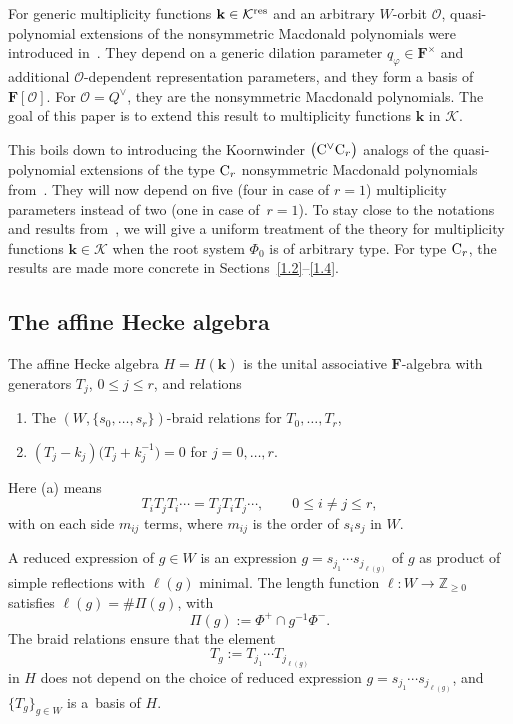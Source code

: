 \documentclass[pdftex]{sigma}
\numberwithin{equation}{section}
\begin{document}
For generic multiplicity functions $\mathbf{k}\in\mathcal{K}^{{\rm res}}$ and an arbitrary $W$-orbit $\mathcal{O}$, quasi-polynomial extensions of the nonsymmetric Macdonald polynomials were introduced in~\cite{SSV2}. They depend on a generic dilation parameter $q_\varphi\in\mathbf{F}^\times$ and additional $\mathcal{O}$-dependent representation parameters, and they form a basis of $\mathbf{F}[\mathcal{O}]$. For $\mathcal{O}=Q^\vee$, they are the nonsymmetric Macdonald polynomials.
The goal of this paper is to extend this result to multiplicity functions $\mathbf{k}$ in $\mathcal{K}$.

This boils down to introducing the Koornwinder $\bigl({\rm C}^\vee{\rm C}_r\bigr)$ analogs of the quasi-polynomial extensions of the type ${\rm C}_r$ nonsymmetric Macdonald polynomials from~\cite{SSV2}. They will now depend on five (four in case of $r=1$) multiplicity parameters instead of two (one in case of~${r=1}$). To stay close to the notations and results from~\cite{SSV2}, we will give a uniform treatment
of the theory for multiplicity functions $\mathbf{k}\in\mathcal{K}$ when the root system $\Phi_0$ is of arbitrary type. For type ${\rm C}_r$, the results are made more concrete in Sections~\ref{1.2}--\ref{1.4}.

\subsection{The affine Hecke algebra}\label{AHAsection}

The affine Hecke algebra $H=H(\mathbf{k})$ is the unital associative $\mathbf{F}$-algebra with generators $T_j$, $0\leq j\leq r$, and relations
\begin{enumerate}\itemsep=0pt\samepage
\item[(a)] The $(W,\{s_0,\dots,s_r\})$-braid relations for $T_0,\dots,T_r$,
\item[(b)] $(T_j-k_j)\bigl(T_j+k_j^{-1}\bigr)=0$ for $j=0,\dots,r$.
\end{enumerate}\pagebreak

\noindent
Here (a) means{\samepage
\[
T_iT_jT_i\cdots=T_jT_iT_j\cdots,\qquad 0\leq i\not=j\leq r,
\]
with on each side $m_{ij}$ terms, where $m_{ij}$ is the order of $s_is_j$ in $W$.}

A reduced expression of $g\in W$ is an expression $g=s_{j_1}\cdots s_{j_{\ell(g)}}$ of $g$ as product of simple reflections with $\ell(g)$ minimal.
The length function $\ell\colon W\rightarrow\mathbb{Z}_{\geq 0}$ satisfies $\ell(g)=\#\Pi(g)$, with
\[
\Pi(g):=\Phi^+\cap g^{-1}\Phi^-.
\]
The braid relations ensure that the element
\[
T_g:=T_{j_1}\cdots T_{j_{\ell(g)}}
\]
in $H$ does not depend on the choice of reduced expression $g=s_{j_1}\cdots s_{j_{\ell(g)}}$, and $\{T_g\}_{g\in W}$ is a~basis of $H$.
\end{document}
